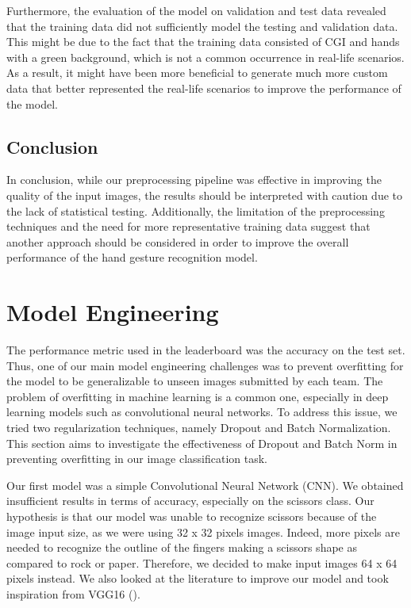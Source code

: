\documentclass[a4paper]{article}
\begin{document}
Furthermore, the evaluation of the model on validation and test data revealed that the training data did not sufficiently model the testing and validation data. This might be due to the fact that the training data consisted of CGI and hands with a green background, which is not a common occurrence in real-life scenarios. As a result, it might have been more beneficial to generate much more custom data that better represented the real-life scenarios to improve the performance of the model.

\subsection{Conclusion}

In conclusion, while our preprocessing pipeline was effective in improving the quality of the input images, the results should be interpreted with caution due to the lack of statistical testing. Additionally, the limitation of the preprocessing techniques and the need for more representative training data suggest that another approach should be considered in order to improve the overall performance of the hand gesture recognition model.



\section{Model Engineering}


The performance metric used in the leaderboard was the accuracy on the test set. Thus, one of our main model engineering challenges was to prevent overfitting for the model to be generalizable to unseen images submitted by each team.
The problem of overfitting in machine learning is a common one, especially in deep learning models such as convolutional neural networks. To address this issue, we tried two regularization techniques, namely Dropout and Batch Normalization.
This section aims to investigate the effectiveness of Dropout and Batch Norm in preventing overfitting in our image classification task. 


Our first model was a simple Convolutional Neural Network (CNN). We obtained insufficient results in terms of accuracy, especially on the scissors class. Our hypothesis is that our model was unable to recognize scissors because of the image input size, as we were using 32 x 32 pixels images. Indeed, more pixels are needed to recognize the outline of the fingers making a scissors shape as compared to rock or paper. Therefore, we decided to make input images 64 x 64 pixels instead. We also looked at the literature to improve our model and took inspiration from VGG16 (\cite{VGG16}).
\end{document}
